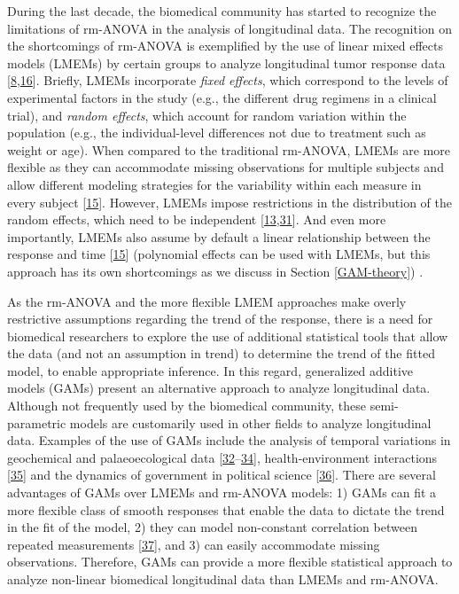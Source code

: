 \documentclass[
]{article}
\begin{document}
During the last decade, the biomedical community has started to recognize the limitations of rm-ANOVA in the analysis of longitudinal data. The recognition on the shortcomings of rm-ANOVA is exemplified by the use of linear mixed effects models (LMEMs) by certain groups to analyze longitudinal tumor response data {[}\protect\hyperlink{ref-skala2010}{8},\protect\hyperlink{ref-vishwanath2009}{16}{]}. Briefly, LMEMs incorporate \emph{fixed effects}, which correspond to the levels of experimental factors in the study (e.g., the different drug regimens in a clinical trial), and \emph{random effects}, which account for random variation within the population (e.g., the individual-level differences not due to treatment such as weight or age). When compared to the traditional rm-ANOVA, LMEMs are more flexible as they can accommodate missing observations for multiple subjects and allow different modeling strategies for the variability within each measure in every subject {[}\protect\hyperlink{ref-pinheiro2006}{15}{]}. However, LMEMs impose restrictions in the distribution of the random effects, which need to be independent {[}\protect\hyperlink{ref-gueorguieva2004}{13},\protect\hyperlink{ref-barr2013}{31}{]}. And even more importantly, LMEMs also assume by default a linear relationship between the response and time {[}\protect\hyperlink{ref-pinheiro2006}{15}{]} (polynomial effects can be used with LMEMs, but this approach has its own shortcomings as we discuss in Section \ref{GAM-theory}) .

As the rm-ANOVA and the more flexible LMEM approaches make overly restrictive assumptions regarding the trend of the response, there is a need for biomedical researchers to explore the use of additional statistical tools that allow the data (and not an assumption in trend) to determine the trend of the fitted model, to enable appropriate inference. In this regard, generalized additive models (GAMs) present an alternative approach to analyze longitudinal data. Although not frequently used by the biomedical community, these semi-parametric models are customarily used in other fields to analyze longitudinal data. Examples of the use of GAMs include the analysis of temporal variations in geochemical and palaeoecological data {[}\protect\hyperlink{ref-rose2012}{32}--\protect\hyperlink{ref-simpson2018}{34}{]}, health-environment interactions {[}\protect\hyperlink{ref-yang2012}{35}{]} and the dynamics of government in political science {[}\protect\hyperlink{ref-beck1998}{36}{]}. There are several advantages of GAMs over LMEMs and rm-ANOVA models: 1) GAMs can fit a more flexible class of smooth responses that enable the data to dictate the trend in the fit of the model, 2) they can model non-constant correlation between repeated measurements {[}\protect\hyperlink{ref-wood2017}{37}{]}, and 3) can easily accommodate missing observations. Therefore, GAMs can provide a more flexible statistical approach to analyze non-linear biomedical longitudinal data than LMEMs and rm-ANOVA.
\end{document}
